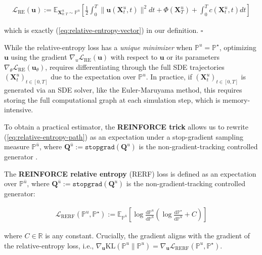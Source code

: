 \documentclass{article}
\newcommand{\boldtext}[1]{\textbf{\textcolor{MyGreen}{#1}}}
\begin{document}
\begin{small}
\begin{align}
    \mathcal{L}_{\text{RE}}(\boldsymbol{u}):=\mathbb{E}_{\boldsymbol{X}^u_{0:T}\sim \mathbb{P}^u}\left[\frac{1}{2}\int_0^T\|\boldsymbol{u}(\boldsymbol{X}^u_t,t)\|^2dt+\Phi(\boldsymbol{X}^u_T)+\int_0^Tc(\boldsymbol{X}^u_t,t)dt\right]
\end{align}
\end{small}
which is exactly (\ref{eq:relative-entropy-vector}) in our definition. \hfill $\square$

While the relative-entropy loss has a \textit{unique minimizer} when $\mathbb{P}^u=\mathbb{P}^\star$, optimizing $\boldsymbol{u}$ using the gradient $\nabla_{u}\mathcal{L}_{\text{RE}}(\boldsymbol{u})$ with respect to $\boldsymbol{u}$ or its parameters $\nabla_\theta\mathcal{L}_{\text{RE}}(\boldsymbol{u}_\theta)$, requires differentiating through the full SDE trajectories $(\boldsymbol{X}^u_t)_{t\in [0,T]}$ due to the expectation over $\mathbb{P}^u$. In practice, if $(\boldsymbol{X}^u_t)_{t\in [0,T]}$ is generated via an SDE solver, like the Euler-Maruyama method, this requires storing the full computational graph at each simulation step, which is memory-intensive. 

To obtain a practical estimator, the \boldtext{REINFORCE trick} allows us to rewrite (\ref{eq:relative-entropy-path}) as an expectation under a stop-gradient sampling measure $\mathbb{P}^{\bar{u}}$, where $\boldsymbol{Q}^{\bar{u}}:=\texttt{stopgrad}(\boldsymbol{Q}^u)$ is the non-gradient-tracking controlled generator \citep{williams1992simple, ranganath2014black, mnih2014neural}.

\begin{definition}\label{def:reinforce}
    The \textbf{REINFORCE relative entropy} (RERF) loss is defined as an expectation over $\mathbb{P}^{\bar{u}}$, where $\boldsymbol{Q}^{\bar{u}}:=\texttt{stopgrad}(\boldsymbol{Q}^u)$ is the non-gradient-tracking controlled generator:
    \begin{small}
    \begin{align}
        \mathcal{L}_{\text{RERF}}(\mathbb{P}^u, \mathbb{P}^\star):=\mathbb{E}_{\mathbb{P}^{\bar{u}}}\left[\log \frac{\mathrm{d}\mathbb{P}^u}{\mathrm{d}\mathbb{P}^{\bar{u}}}\left(\log \frac{\mathrm{d}\mathbb{P}^\star}{\mathrm{d}\mathbb{P}^{\bar{u}}}+C\right)\right]\tag{RERF Loss}\label{eq:rerf-loss}
    \end{align}
    \end{small}
    where $C\in \mathbb{R}$ is any constant. Crucially, the gradient aligns with the gradient of the relative-entropy loss, i.e., $\nabla_{\boldsymbol{u}}\text{KL}(\mathbb{P}^u\|\mathbb{P}^u)=\nabla_{\boldsymbol{u}}\mathcal{L}_{\text{RERF}}(\mathbb{P}^u, \mathbb{P}^\star)$.
\end{definition}
\end{document}
